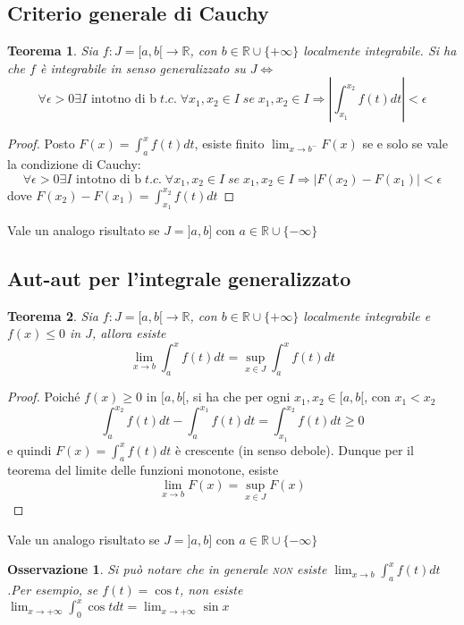 \documentclass[a4paper; 11pt oneside]{book}
\theoremstyle{break}
\newtheorem{teo}{Teorema}[chapter]
\theoremstyle{peresempio}
\newtheorem{oss}[cor]{Osservazione}
\begin{document}
    \subsection{Criterio generale di Cauchy}
  \begin{teo}
  Sia $f:J=[a,b[\to \mathbb{R}$, con $b\in \mathbb{R}\cup\{+\infty\}$ localmente integrabile.\newline
    Si ha che $f$ è integrabile in senso generalizzato su $J\Leftrightarrow$ $$\forall\epsilon>0\exists I\text{ intotno di b} \; t.c. \;\forall x_1,x_2\in I\;se\; x_1,x_2\in I\Rightarrow\left|\int_{x_1}^{x_2}f(t)dt \right|<\epsilon$$
    \end{teo}
    \begin{proof}
    Posto $F(x)=\int_a^xf(t)dt$, esiste finito $\lim_{x\to b^-}F(x)$ se e solo se vale la condizione di Cauchy: $$\forall\epsilon>0\exists I\text{ intotno di b} \; t.c. \;\forall x_1,x_2\in I\;se\; x_1,x_2\in I\Rightarrow\left|F(x_2)-F(x_1) \right|<\epsilon$$
    dove $F(x_2)-F(x_1)=\int_{x_1}^{x_2}f(t)dt$
    \end{proof}
    Vale un analogo risultato se $J=]a,b]$ con $a\in\mathbb{R}\cup\{-\infty\}$
    \subsection{Aut-aut per l'integrale generalizzato}
    \begin{teo}
    Sia $f:J=[a,b[\to \mathbb{R}$, con $b\in \mathbb{R}\cup\{+\infty\}$ localmente integrabile e $f(x)\leq 0$ in $J$, allora esiste $$
    \lim_{x\to b}\int_a^x f(t)dt=\sup_{x\in J}\int_a^x f(t)dt
    $$
    \end{teo}
    \begin{proof}
    Poiché $f(x)\geq 0$ in $[a,b[$, si ha che per ogni $x_1,x_2\in[a,b[$, con $x_1<x_2$
    $$
    \int_a^{x_2} f(t)dt-\int_a^{x_1} f(t)dt=\int_{x_1}^{x_2} f(t)dt\geq 0
    $$
    e quindi $F(x)=\int_a^{x} f(t)dt$ è crescente (in senso debole). Dunque per il teorema del limite delle funzioni monotone, esiste
    $$
    \lim_{x\to b}F(x)=\sup_{x\in J}F(x)
    $$
    \end{proof}
    Vale un analogo risultato se $J=]a,b]$ con $a\in\mathbb{R}\cup\{-\infty\}$
    \begin{oss}
    Si può notare che in generale \textsc{non} esiste $\lim_{x\to b}\int_a^x f(t)dt$.\newline Per esempio, se $f(t)=\cos t$, non esiste $\lim_{x\to +\infty}\int_0^x \cos t dt=\lim_{x\to +\infty} \sin x$
    \end{oss}
\end{document}
